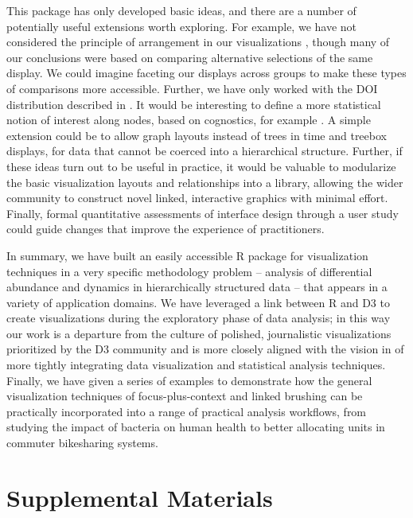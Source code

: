 \documentclass[12pt]{article}
\begin{document}
This package has only developed basic ideas, and there are a number of
potentially useful extensions worth exploring. For example, we have not
considered the principle of arrangement in our visualizations
\citep{buja1996interactive}, though many of our conclusions were based on
comparing alternative selections of the same display. We could imagine faceting
our displays across groups to make these types of comparisons more accessible.
Further, we have only worked with the DOI distribution described in
\citep{heer2004doitrees}. It would be interesting to define a more statistical
notion of interest along nodes, based on cognostics, for example
\citep{hafen2013trelliscope, friedman2002john}. A simple extension could be to
allow graph layouts instead of trees in time and treebox displays, for data that
cannot be coerced into a hierarchical structure. Further, if these ideas turn
out to be useful in practice, it would be valuable to modularize the basic
visualization layouts and relationships into a library, allowing the wider
community to construct novel linked, interactive graphics with minimal effort.
Finally, formal quantitative assessments of interface design through a user
study could guide changes that improve the experience of practitioners.

In summary, we have built an easily accessible R package for visualization
techniques in a very specific methodology problem -- analysis of differential
abundance and dynamics in hierarchically structured data -- that appears in a
variety of application domains. We have leveraged a link between R and D3
\citep{vaidyanathan2014htmlwidgets} to create visualizations during the
exploratory phase of data analysis; in this way our work is a departure from the
culture of polished, journalistic visualizations prioritized by the D3 community
and is more closely aligned with the vision in \citep{de2003visual} of more
tightly integrating data visualization and statistical analysis techniques.
Finally, we have given a series of examples to demonstrate how the general
visualization techniques of focus-plus-context and linked brushing can be
practically incorporated into a range of practical analysis workflows, from
studying the impact of bacteria on human health to better allocating units in
commuter bikesharing systems.




\section{Supplemental Materials}
\end{document}
